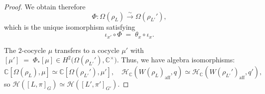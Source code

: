 \documentclass[american]{article}
\numberwithin{equation}{section}
\numberwithin{figure}{section}
\theoremstyle{plain}
\theoremstyle{definition}
\theoremstyle{remark}
\newcommand{\CC}{\mathbb{C}}
\begin{document}
\begin{proof}
We obtain therefore
\[
\Phi \colon \Omega(\rho_L) \xrightarrow{\sim} \Omega(\rho_{L'}'),
\]
which is the unique isomorphism satisfying
\[
  \iota_{x'}\circ \Phi\;=\;\theta_x\circ \iota_x.
\]

The $2$-cocycle $\mu$ transfers to a cocycle $\mu'$ with
\(
  [\mu'] \;=\; \Phi_*[\mu]\in H^2\!\big(\Omega(\rho_{L'}'),\CC^\times\big).
\)
Thus, we have algebra isomorphisms:
\[
\mathbb{C}[\Omega(\rho_L), \mu] \simeq \mathbb{C}[\Omega(\rho_{L'}'), \mu'], \quad \mathcal{H}_{\mathbb{C}}(W(\rho_L)_{\text{aff}}, q) \simeq \mathcal{H}_{\mathbb{C}}(W(\rho_{L'}')_{\text{aff}}, q'),
\]
so \(\mathcal{H}([L, \pi]_G) \simeq \mathcal{H}([L', \pi']_{G'})\).  

\noindent

\end{proof}
\end{document}
